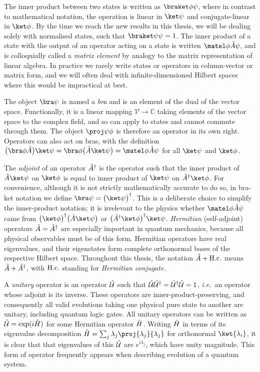 The inner product between two states is written as $\braket\phi\psi$, where in contrast to mathematical notation, the operation is linear in $\ket\psi$ and conjugate-linear in $\ket\phi$.
By the time we reach the new results in this thesis, we will be dealing solely with normalised states, such that $\braket\psi\psi = 1$.
The inner product of a state with the output of an operator acting on a state is written $\matel\phi{\op A}\psi$, and is colloquially called a \emph{matrix element} by analogy to the matrix representation of linear algebra.
In practice we rarely write states or operators in column-vector or matrix form, and we will often deal with infinite-dimensioned Hilbert spaces where this would be impractical at best.

The object $\bra\psi$ is named a \emph{bra} and is an element of the dual of the vector space.
Functionally, it is a linear mapping $\mathcal V\to \mathbb C$ taking elements of the vector space to the complex field, and so can apply to states and cannot commute through them.
The object $\proj\psi\phi$ is therefore an operator in its own right.
Operators can also act on bras, with the definition $\bigl(\bra\phi\op A\bigr)\ket\psi = \bra\phi\bigl(\op A\ket\psi\bigr) = \matel\phi{\op A}\psi$ for all $\ket\psi$ and $\ket\phi$.

The \emph{adjoint} of an operator $\hat{A}^\dagger$ is the operator such that the inner product of $\op A\ket\psi$ on $\ket\phi$ is equal to inner product of $\ket\psi$ on $\op A^\dagger\ket\phi$.
For convenience, although it is not strictly mathematically accurate to do so, in bra-ket notation we define $\bra\psi = {\bigl(\ket\psi\bigr)}^\dagger$.
This is a deliberate choice to simplify the inner-product notation; it is irrelevant to the physics whether $\matel\phi{\op A}\psi$ came from $\bigl(\ket\phi\bigr)^\dagger\bigl(\op A\ket\psi\bigr)$ or $\bigl(\op A^\dagger\ket\phi\bigr)^\dagger\ket\psi$.
\emph{Hermitian} (self-adjoint) operators $\hat{A} = \hat{A}^\dagger$ are especially important in quantum mechanics, because all physical observables must be of this form.
Hermitian operators have real eigenvalues, and their eigenstates form complete orthonormal bases of the respective Hilbert space.
Throughout this thesis, the notation $\hat{A} + \text{H.c.}$ means $\hat{A} + \hat{A}^\dagger$, with $\text{H.c.}$ standing for \emph{Hermitian conjugate}.

A \emph{unitary} operator is an operator $\hat{\mathcal U}$ such that $\hat{\mathcal U}\hat{\mathcal U}^\dagger = \hat{\mathcal U}^\dagger\hat{\mathcal U} = 1$, \textit{i.e.}\ an operator whose adjoint is its inverse.
These operators are inner-product-preserving, and consequently all valid evolutions taking one physical pure state to another are unitary, including quantum logic gates.
All unitary operators can be written as $\hat{\mathcal U} = \exp(i\hat{H})$ for some Hermitian operator $\hat{H}$.
Writing $\hat{H}$ in terms of its eigenvalue decomposition $\op H = \sum_j \lambda_j \proj{\lambda_j}{\lambda_j}$ for orthonormal $\ket{\lambda_i}$, it is clear that that eigenvalues of this $\hat{\mathcal U}$ are $e^{i\lambda_j}$, which have unity magnitude.
This form of operator frequently appears when describing evolution of a quantum system.

